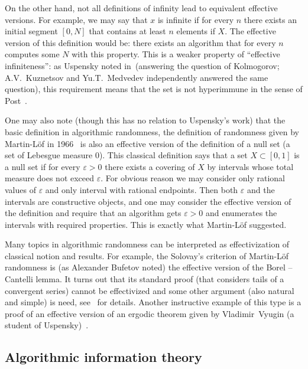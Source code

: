 \documentclass[12pt]{article}
\theoremstyle{remark}
\let\eps=\varepsilon
\begin{document}
On the other hand, not all definitions of infinity lead to equivalent effective versions. For example, we may say that $x$ is infinite if for every $n$ there exists an initial segment $[0,N]$ that contains at least $n$ elements if $X$. The effective version of this definition would be: there exists an algorithm that for every $n$ computes some $N$ with this property. This is a weaker property of ``effective infiniteness'': as Uspensky noted in~\cite{1957a}(answering the question of Kolmogorov; A.V.~Kuznetsov and Yu.T.~Medvedev independently answered the same question), this requirement means that the set is not hyperimmune in the sense of Post~\cite{Post1944}.

One may also note (though this has no relation to Uspensky's work) that the basic definition in algorithmic randomness, the definition of randomness given by Martin-L\"{o}f in 1966~\cite{MartinLof1966} is also an effective version of the definition of a null set (a set of Lebesgue measure $0$). This classical definition says that a set $X\subset [0,1]$ is a null set if for every $\eps>0$ there exists a covering of $X$ by intervals whose total measure does not exceed $\eps$. For obvious reason we may consider only rational values of $\eps$ and only interval with rational endpoints. Then both $\eps$ and the intervals are constructive objects, and one may consider the effective version of the definition and require that an algorithm gets $\eps>0$ and enumerates the intervals with required properties. This is exactly what Martin-L\"{o}f suggested.

Many topics in algorithmic randomness can be interpreted as effectivization of classical notion and results. For example, the Solovay's criterion of Martin-L\"{o}f randomness is (as Alexander Bufetov noted) the effective version of the Borel -- Cantelli lemma. It turns out that its standard proof (that considers tails of a convergent series) cannot be effectivized and some other argument (also natural and simple) is need, see~\cite{2013} for details. Another instructive example of this type is a proof of an effective version of an ergodic theorem given by Vladimir~Vyugin (a student of Uspensky)~\cite{Vyugin1998}.

\subsection*{Algorithmic information theory}
\end{document}
